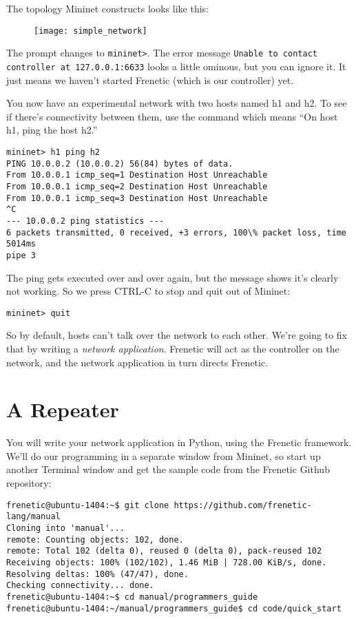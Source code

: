 The topology Mininet constructs looks like this:

\begin{figure}[h]
\centering
\texttt{[image: simple\_network]}
\end{figure}

The prompt changes to {\tt mininet>}.  
The error message {\tt Unable to contact controller at 127.0.0.1:6633} looks a little ominous, but you can ignore it.
It just means we haven't started Frenetic (which is our controller) yet.    

You now have an experimental network with two hosts named h1 and h2.  
To see if there's connectivity between them, use the command  which means 
``On host h1, ping the host h2.''

\begin{verbatim}
mininet> h1 ping h2
PING 10.0.0.2 (10.0.0.2) 56(84) bytes of data.
From 10.0.0.1 icmp_seq=1 Destination Host Unreachable
From 10.0.0.1 icmp_seq=2 Destination Host Unreachable
From 10.0.0.1 icmp_seq=3 Destination Host Unreachable
^C
--- 10.0.0.2 ping statistics ---
6 packets transmitted, 0 received, +3 errors, 100\% packet loss, time 5014ms
pipe 3
\end{verbatim}

The ping gets executed over and over again, but the  message
shows it's clearly not working.  So we press CTRL-C to stop and 
quit out of Mininet:

\begin{verbatim}
mininet> quit
\end{verbatim}

So by default, hosts can't talk over the network to each other.  We're going to fix that by writing a {\it network
application}.    Frenetic will act as the controller on the network, and the network application in turn directs 
Frenetic.

\section{A Repeater}

You will write your network application in Python, using the Frenetic framework.  
We'll do our programming in a separate window from Mininet, so start up another Terminal window and
get the sample code from the Frenetic Github repository:

\begin{verbatim}
frenetic@ubuntu-1404:~$ git clone https://github.com/frenetic-lang/manual
Cloning into 'manual'...
remote: Counting objects: 102, done.
remote: Total 102 (delta 0), reused 0 (delta 0), pack-reused 102
Receiving objects: 100% (102/102), 1.46 MiB | 728.00 KiB/s, done.
Resolving deltas: 100% (47/47), done.
Checking connectivity... done.
frenetic@ubuntu-1404:~$ cd manual/programmers_guide
frenetic@ubuntu-1404:~/manual/programmers_guide$ cd code/quick_start
\end{verbatim}

